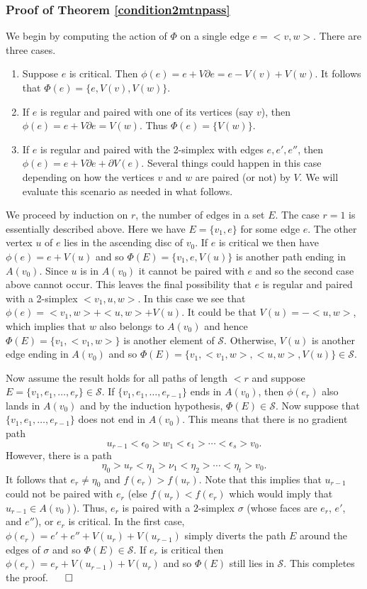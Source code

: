 \documentclass[11pt]{amsart}
\theoremstyle{definition}
\begin{document}
\subsubsection*{Proof of Theorem \ref{condition2mtnpass}} We begin by computing the action of ${\Phi}$ on a single edge $e=<v,w>$. There are three cases.
\begin{enumerate}
\item Suppose $e$ is critical. Then $\phi(e) = e+V\partial e = e-V(v)+V(w)$. It follows that ${\Phi}(e) = \{e,V(v),V(w)\}$.
\item If $e$ is regular and paired with one of its vertices (say $v$), then $\phi(e) = e+V\partial e = V(w)$. Thus $\Phi(e) = \{V(w)\}$.
\item If $e$ is regular and paired with the 2-simplex with edges $e,e',e''$, then $\phi(e) = e+V\partial e+\partial V(e)$. Several things could happen in this case depending on how the vertices $v$ and $w$ are paired (or not) by $V$. We will evaluate this scenario as needed in what follows. 
\end{enumerate}

We proceed by induction on $r$, the number of edges in a set $E$. The case $r=1$ is essentially described above. Here we have $E=\{v_1,e\}$ for some edge $e$. The other vertex $u$ of $e$ lies in the ascending disc of $v_0$. If $e$ is critical we then have $\phi(e) = e + V(u)$ and so ${\Phi}(E) = \{v_1,e,V(u)\}$ is another path ending in $A(v_0)$. Since $u$ is in $A(v_0)$ it cannot be paired with $e$ and so the second case above cannot occur. This leaves the final possibility that $e$ is regular and paired with a 2-simplex $<v_1,u,w>$. In this case we see that $\phi(e) = <v_1,w>+<u,w> + V(u)$. It could be that $V(u) = -<u,w>$, which implies that $w$ also belongs to $A(v_0)$ and hence ${\Phi}(E) = \{v_1,<v_1,w>\}$ is another element of $\mathcal S$. Otherwise, $V(u)$ is another edge ending in $A(v_0)$ and so ${\Phi}(E) = \{v_1,<v_1,w>,<u,w>,V(u)\}\in {\mathcal S}$.

Now assume the result holds for all paths of length $< r$ and suppose $E=\{v_1,e_1,\dots,e_r\}\in {\mathcal S}$. If $\{v_1,e_1,\dots,e_{r-1}\}$ ends in $A(v_0)$, then $\phi(e_r)$ also lands in $A(v_0)$ and by the induction hypothesis, $\Phi(E)\in {\mathcal S}$. Now suppose that $\{v_1,e_1,\dots,e_{r-1}\}$ does not end in $A(v_0)$. This means that there is no gradient path $$u_{r-1}<\epsilon_0>w_1<\epsilon_1>\cdots<\epsilon_s>v_0.$$ However, there is a path $$\eta_0>u_r<\eta_1>\nu_1<\eta_2>\cdots<\eta_t>v_0.$$ It follows that $e_r\ne\eta_0$ and $f(e_r)>f(u_r)$. Note that this implies that $u_{r-1}$ could not be paired with $e_r$ (else $f(u_r)<f(e_r)$ which would imply that $u_{r-1}\in A(v_0)$). Thus, $e_r$ is paired with a $2$-simplex $\sigma$ (whose faces are $e_r$, $e'$, and $e''$), or $e_r$ is critical. In the first case, $\phi(e_r)=e'+e''+V(u_r)+V(u_{r-1})$ simply diverts the path $E$ around the edges of $\sigma$ and so ${\Phi}(E)\in{\mathcal S}$. If $e_r$ is critical then $\phi(e_r)=e_r+V(u_{r-1})+V(u_r)$ and so ${\Phi}(E)$ still lies in ${\mathcal S}$. This completes the proof. \hfill $\qed$
\end{document}
